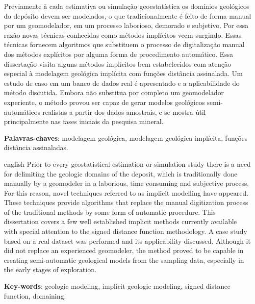 \documentclass[
	12pt,				%
	openright,			%
	twoside,			%
	a4paper,			%
	english,			%
	french,				%
	spanish,			%
	brazil				%
	]{abntex2}
\begin{document}
\setlength{\absparsep}{18pt} %
\begin{resumo}
Previamente à cada estimativa ou simulação geoestatística os domínios geológicos do depósito devem ser modelados, o que tradicionalmente é feito de forma manual por um geomodelador, em um processo laborioso, demorado e subjetivo. Por essa razão novas técnicas conhecidas como métodos implícitos veem surgindo. Essas técnicas fornecem algoritmos que substituem o processo de digitalização manual dos métodos explícitos por alguma forma de procedimento automático. Essa dissertação visita alguns métodos implícitos bem estabelecidos com atenção especial à modelagem geológica implícita com funções distância assinalada. Um estudo de caso em um banco de dados real é apresentado e a aplicabilidade do método discutida. Embora não substitua por completo um geomodelador experiente, o método provou ser capaz de gerar modelos geológicos semi-automáticos realistas a partir dos dados amostrais, e se mostra útil principalmente nas fases iniciais da pesquisa mineral.  

 \textbf{Palavras-chaves}: modelagem geológica, modelagem geológica implícita, funções distância assinaladas.
\end{resumo}

\begin{resumo}[Abstract]
 \begin{otherlanguage*}{english}
Prior to every geostatistical estimation or simulation study there is a need for delimiting the geologic domains of the deposit, which is traditionally done manually by a geomodeler in a laborious, time consuming and subjective process. For this reason, novel techniques referred to as implicit modelling have appeared. These techniques provide algorithms that replace the manual digitization process of the traditional methods by some form of automatic procedure. This dissertation covers a few well established implicit methods currently available with special attention to the signed distance function methodology. A case study based on a real dataset was performed and its applicability discussed. Although it did not replace an experienced geomodeler, the method proved to be capable in creating semi-automatic geological models from the sampling data, especially in the early stages of exploration.

   \vspace{\onelineskip}
 
   \noindent 
   \textbf{Key-words}: geologic modeling, implicit geologic modeling, signed distance function, domaining.
 \end{otherlanguage*}
\end{resumo}
\end{document}
